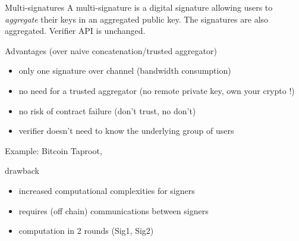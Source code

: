 \documentclass[aspectratio=43]{beamer}
\begin{document}
 
  \begin{frame}{Multi-signatures}
 A multi-signature is a digital signature allowing users to {\it aggregate} their keys in an aggregated public key. The signatures are also aggregated.
  Verifier API is unchanged.
  
  
  {
  \begin{exampleblock}{Advantages (over naive concatenation/trusted aggregator)}
  \begin{itemize}
  \item only one signature over channel (bandwidth consumption)
  \item no need for a trusted aggregator (no remote private key, own your crypto !)
  \item no risk of contract failure (don't trust, no don't)
  \item verifier doesn't need to know the underlying group of users
  \end{itemize}
  \end{exampleblock}
  
  Example: Bitcoin Taproot, \href{https://en.bitcoin.it/wiki/BIP_0340}{}
  }
  {
  \begin{alertblock}{drawback}
   \begin{itemize}
  \item increased computational complexities for signers
  \item requires (off chain) communications between signers  
  \item computation in 2 rounds (Sig1, Sig2)


\end{itemize}
\end{alertblock}}
\end{frame}
\end{document}
